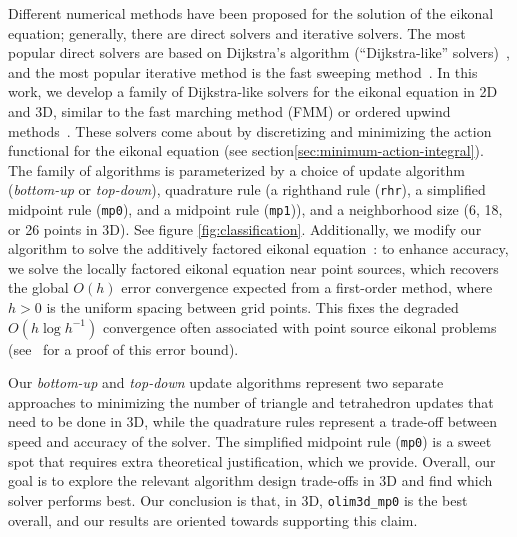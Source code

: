 \documentclass[smallcondensed]{svjour3}
\begin{document}
Different numerical methods have been proposed for the solution of the
eikonal equation; generally, there are direct solvers and iterative
solvers. The most popular direct solvers are based on Dijkstra's
algorithm (``Dijkstra-like''
solvers)~\cite{tsitsiklis1995efficient,sethian1996fast}, and the most
popular iterative method is the fast sweeping
method~\cite{tsai2003fast,zhao2005fast}. In this work, we develop a
family of Dijkstra-like solvers for the eikonal equation in 2D and 3D,
similar to the fast marching method (FMM) or ordered upwind
methods~\cite{sethian1996fast,sethian2003ordered}. These solvers come
about by discretizing and minimizing the action functional for the
eikonal equation (see section\@ \ref{sec:minimum-action-integral}). The
family of algorithms is parameterized by a choice of update algorithm
(\emph{bottom-up} or \emph{top-down}), quadrature rule (a
righthand rule (\texttt{rhr}), a simplified midpoint rule
(\texttt{mp0}), and a midpoint rule (\texttt{mp1})), and a
neighborhood size (6, 18, or 26 points in 3D). See figure
\ref{fig:classification}. Additionally, we modify our algorithm to
solve the additively factored eikonal equation~\cite{luo2012fast}: to
enhance accuracy, we solve the locally factored eikonal equation near
point sources, which recovers the global $O(h)$ error convergence
expected from a first-order method, where $h > 0$ is the uniform
spacing between grid points. This fixes the degraded
$O(h \log h^{-1})$ convergence often associated with point source
eikonal problems~\cite{qi2018corner} (see~\cite{zhao2005fast} for a
proof of this error bound).

Our \emph{bottom-up} and \emph{top-down} update algorithms
represent two separate approaches to minimizing the number of triangle
and tetrahedron updates that need to be done in 3D, while the
quadrature rules represent a trade-off between speed and accuracy of
the solver. The simplified midpoint rule (\texttt{mp0}) is a sweet
spot that requires extra theoretical justification, which we
provide. Overall, our goal is to explore the relevant algorithm design
trade-offs in 3D and find which solver performs best. Our conclusion
is that, in 3D, \texttt{olim3d\_mp0} is the best overall, and our
results are oriented towards supporting this claim.
\end{document}
